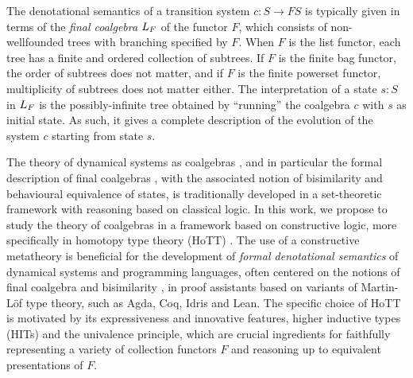 \documentclass[final,a4paper,USenglish,cleveref]{lipics-v2021}
\begin{document}
The denotational semantics of a transition system $c : S \to F S$ is typically given in terms of the \emph{final coalgebra} $\Lim{F}$ of the functor $F$, which  consists of non-wellfounded trees with branching specified by $F$. When $F$ is the list functor, each tree has a finite and ordered collection of subtrees. If $F$ is the finite bag functor, the order of subtrees does not matter, and if $F$ is the finite powerset functor, multiplicity of subtrees does not matter either. %
The interpretation of a state $s : S$ in $\Lim{F}$ is the possibly-infinite tree obtained by ``running'' the coalgebra $c$ with $s$ as initial state. As such, it gives a complete description of the evolution of the system $c$ starting from state $s$.

The theory of dynamical systems as coalgebras \cite{Rutten2000,Jacobs2016}, and in particular the formal description of final coalgebras \cite{Barr1993,Adamek1995,Worrell2005}, with the associated notion of bisimilarity and behavioural equivalence of states, is traditionally developed in a set-theoretic framework with reasoning based on classical logic. In this work, we propose to study the theory of coalgebras in a framework based on constructive logic, more specifically in homotopy type theory (HoTT) \cite{HoTTBook}. The use of a constructive metatheory is beneficial for the development of \emph{formal denotational semantics} of dynamical systems and programming languages, often centered on the notions of final coalgebra and bisimilarity \cite{Turi1997}, in proof assistants based on variants of Martin-L{\"o}f type theory, such as Agda, Coq, Idris and Lean. The specific choice of HoTT is motivated by its expressiveness and innovative features, higher inductive types (HITs) and the univalence principle, which are crucial ingredients for faithfully representing a variety of collection functors $F$ and reasoning up to equivalent presentations of $F$. 
\end{document}
